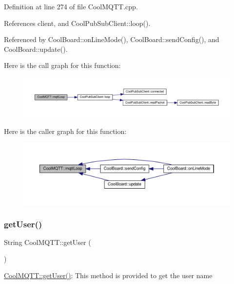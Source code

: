 Definition at line 274 of file Cool\+M\+Q\+T\+T.\+cpp.



References client, and Cool\+Pub\+Sub\+Client\+::loop().



Referenced by Cool\+Board\+::on\+Line\+Mode(), Cool\+Board\+::send\+Config(), and Cool\+Board\+::update().

Here is the call graph for this function\+:
\nopagebreak
\begin{figure}[H]
\begin{center}
\leavevmode
\includegraphics[width=350pt]{d0/dd0/class_cool_m_q_t_t_aa5eaae967b562b62cbcf2b8d81f6e5d5_cgraph}
\end{center}
\end{figure}
Here is the caller graph for this function\+:
\nopagebreak
\begin{figure}[H]
\begin{center}
\leavevmode
\includegraphics[width=350pt]{d0/dd0/class_cool_m_q_t_t_aa5eaae967b562b62cbcf2b8d81f6e5d5_icgraph}
\end{center}
\end{figure}
\mbox{\label{class_cool_m_q_t_t_a373cc92fca7760d886f02d8a6e5b3f63}} 
\subsubsection{\texorpdfstring{get\+User()}{getUser()}}
{\footnotesize\ttfamily String Cool\+M\+Q\+T\+T\+::get\+User (\begin{DoxyParamCaption}{ }\end{DoxyParamCaption})}

\hyperlink{class_cool_m_q_t_t_a373cc92fca7760d886f02d8a6e5b3f63}{Cool\+M\+Q\+T\+T\+::get\+User()}\+: This method is provided to get the user name 

